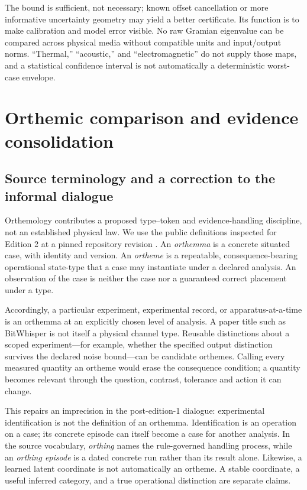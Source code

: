 \documentclass[11pt,a4paper]{article}
\theoremstyle{definition}
\theoremstyle{remark}
\begin{document}
The bound is sufficient, not necessary; known offset cancellation or more informative uncertainty geometry may yield a better certificate. Its function is to make calibration and model error visible. No raw Gramian eigenvalue can be compared across physical media without compatible units and input/output norms. ``Thermal,'' ``acoustic,'' and ``electromagnetic'' do not supply those maps, and a statistical confidence interval is not automatically a deterministic worst-case envelope.


\section{Orthemic comparison and evidence consolidation}\label{sec:orthemic}
\subsection{Source terminology and a correction to the informal dialogue}
Orthemology contributes a proposed type--token and evidence-handling discipline, not an established physical law. We use the public definitions inspected for Edition 2 at a pinned repository revision \citep{orthemology}. An \emph{orthemma} is a concrete situated case, with identity and version. An \emph{ortheme} is a repeatable, consequence-bearing operational state-type that a case may instantiate under a declared analysis. An observation of the case is neither the case nor a guaranteed correct placement under a type.

Accordingly, a particular experiment, experimental record, or apparatus-at-a-time is an orthemma at an explicitly chosen level of analysis. A paper title such as BitWhisper is not itself a physical channel type. Reusable distinctions about a scoped experiment---for example, whether the specified output distinction survives the declared noise bound---can be candidate orthemes. Calling every measured quantity an ortheme would erase the consequence condition; a quantity becomes relevant through the question, contrast, tolerance and action it can change.

This repairs an imprecision in the post-edition-1 dialogue: experimental identification is not the definition of an orthemma. Identification is an operation on a case; its concrete episode can itself become a case for another analysis. In the source vocabulary, \emph{orthing} names the rule-governed handling process, while an \emph{orthing episode} is a dated concrete run rather than its result alone. Likewise, a learned latent coordinate is not automatically an ortheme. A stable coordinate, a useful inferred category, and a true operational distinction are separate claims.
\end{document}
